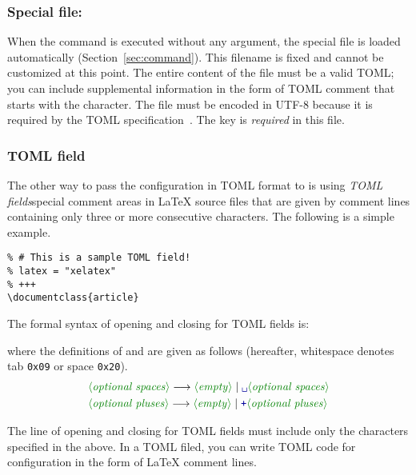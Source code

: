 \documentclass[draft]{llmk-doc}
\begin{document}
\subsubsection*{Special file: }

When the  command is executed without any argument, the special file
 is loaded automatically (Section~\ref{sec:command}). This
filename is fixed and cannot be customized at this point. The entire content of
the file must be a valid TOML; you can include supplemental information in the
form of TOML comment that starts with the \code{\#} character. The file must
be encoded in UTF-8 because it is required by the TOML
specification~\cite{toml}. The  key is \emph{required} in this
file.

\subsubsection*{TOML field}

The other way to pass the configuration in TOML format to  is using
\emph{TOML fields}\Dash special comment areas in {\LaTeX} source files that are
given by comment lines containing only three or more consecutive \code{+}
characters. The following is a simple example.
%
\begin{lstlisting}[style=latex]
% +++
% # This is a sample TOML field!
% latex = "xelatex"
% +++
\documentclass{article}
\end{lstlisting}

The formal syntax of opening and closing for TOML fields is:
%
\begin{htcode}
\end{htcode}
%
where the definitions of  and  are
given as follows (hereafter, whitespace \code{\textvisiblespace} denotes tab
\texttt{0x09} or space \texttt{0x20}).
%
\begin{align*}
&\text{\meta{optional spaces}}
  \longrightarrow \text{\meta{empty}}
  \mid\text{\code{\textvisiblespace}\meta{optional spaces}} \\
&\text{\meta{optional pluses}}
  \longrightarrow \text{\meta{empty}}
  \mid\text{\code{+}\meta{optional pluses}}
\end{align*}

The line of opening and closing for TOML fields must include only the
characters specified in the above. In a TOML filed, you can write TOML code for
 configuration in the form of {\LaTeX} comment lines.
%
\begin{htcode}
\end{htcode}
\end{document}
